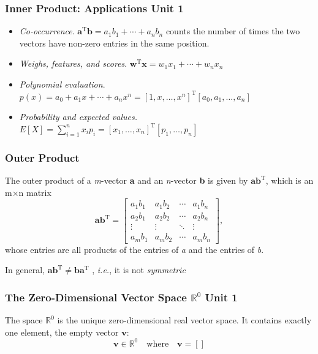 \documentclass[12pt]{beamer}
\newcommand{\FrameTitle}[2]{\frametitle{#1 \hfill \small\textnormal{\textcolor{midgray}{#2}}}}
\newcommand{\vsp}{\vspace*{1em}}
\newcommand{\smallvspace}{\vspace*{0.5em}}
\newcommand{\Vector}[1]{\textbf{#1}}
\begin{document}
\begin{frame}\FrameTitle{Inner Product: Applications}{Unit 1}
    \begin{itemize}
        \item \emph{Co-occurrence}. $\Vector{a}^{\textrm{T}} \Vector{b} = a_1b_1 + \cdots + a_nb_n$ counts the number of times the two vectors have non-zero entries in the same position.
        \smallvspace
        \item \emph{Weighs, features, and scores}. $\Vector{w}^{\textrm{T}} \Vector{x} = w_1x_1 + \cdots + w_nx_n$
        \smallvspace
        \item \emph{Polynomial evaluation}. $p(x) = a_0 + a_1x + \cdots + a_nx^n = [1, x, \ldots, x^n]^{\textrm{T}}[a_0, a_1, \ldots, a_n]$
        \smallvspace
        \item \emph{Probability and expected values.} $E[X] = \sum_{i=1}^{n} x_i p_i = [x_1, \ldots, x_n]^{\textrm{T}}[p_1, \ldots, p_n]$
    \end{itemize}
\end{frame}


\begin{frame}\FrameTitle{Outer Product}{}
    \begin{definition}
        The outer product of a \emph{m}-vector \Vector{a} and an \emph{n}-vector \Vector{b} is
        given by $\Vector{a}\Vector{b}^{\textrm{T}}$, which is an m×n matrix
        \[
            \Vector{a}\Vector{b}^{\textrm{T}} = \begin{bmatrix}
                a_1b_1 & a_1b_2 & \cdots & a_1b_n \\
                a_2b_1 & a_2b_2 & \cdots & a_2b_n \\
                \vdots & \vdots & \ddots & \vdots \\
                a_mb_1 & a_mb_2 & \cdots & a_mb_n
            \end{bmatrix},
        \]
        whose entries are all products of the entries of \emph{a} and the entries of \emph{b}.
    \end{definition}

    \vsp
    In general, $\Vector{a}\Vector{b}^{\textrm{T}} \neq \Vector{b}\Vector{a}^{\textrm{T}}$ , \emph{i.e.},
    it is not \emph{symmetric}\vspace*{3pt}\\
\end{frame}



\begin{frame}\FrameTitle{The Zero-Dimensional Vector Space $\mathbb{R}^0$}{Unit 1}
    \begin{definition}
        The space $\mathbb{R}^0$ is the unique zero-dimensional real vector space.
        It contains exactly one element, the empty vector $\Vector{v}$:
        \[
            \Vector{v} \in \mathbb{R}^0 \quad \text{where} \quad \Vector{v} = [ ]
        \]
    \end{definition}
\end{frame}
\end{document}
